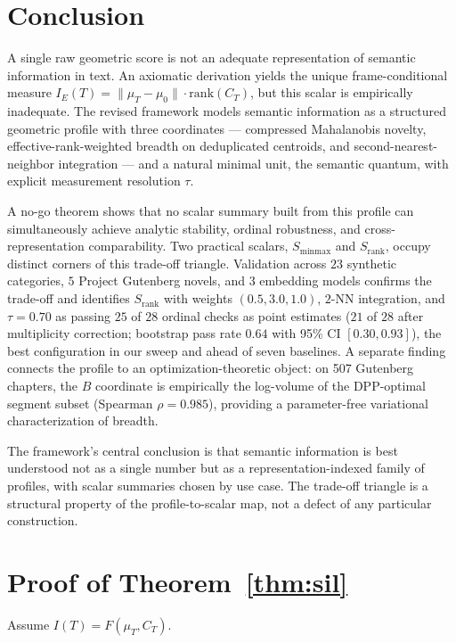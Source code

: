 \documentclass[11pt]{article}
\begin{document}
\section{Conclusion}

A single raw geometric score is not an adequate representation of semantic information in text. An axiomatic derivation yields the unique frame-conditional measure $I_E(T) = \|\mu_T - \mu_0\| \cdot \mathrm{rank}(C_T)$, but this scalar is empirically inadequate. The revised framework models semantic information as a structured geometric profile with three coordinates --- compressed Mahalanobis novelty, effective-rank-weighted breadth on deduplicated centroids, and second-nearest-neighbor integration --- and a natural minimal unit, the semantic quantum, with explicit measurement resolution $\tau$.

A no-go theorem shows that no scalar summary built from this profile can simultaneously achieve analytic stability, ordinal robustness, and cross-representation comparability. Two practical scalars, $S_{\mathrm{minmax}}$ and $S_{\mathrm{rank}}$, occupy distinct corners of this trade-off triangle. Validation across $23$ synthetic categories, $5$ Project Gutenberg novels, and $3$ embedding models confirms the trade-off and identifies $S_{\mathrm{rank}}$ with weights $(0.5, 3.0, 1.0)$, $2$-NN integration, and $\tau = 0.70$ as passing $25$ of $28$ ordinal checks as point estimates ($21$ of $28$ after multiplicity correction; bootstrap pass rate $0.64$ with 95\% CI $[0.30, 0.93]$), the best configuration in our sweep and ahead of seven baselines. A separate finding connects the profile to an optimization-theoretic object: on 507 Gutenberg chapters, the $B$ coordinate is empirically the log-volume of the DPP-optimal segment subset (Spearman $\rho = 0.985$), providing a parameter-free variational characterization of breadth.

The framework's central conclusion is that semantic information is best understood not as a single number but as a representation-indexed family of profiles, with scalar summaries chosen by use case. The trade-off triangle is a structural property of the profile-to-scalar map, not a defect of any particular construction.

\appendix
\section{Proof of Theorem~\ref{thm:sil}}\label{app:sil}

\noindent Assume $I(T) = F(\mu_T, C_T)$.
\end{document}
